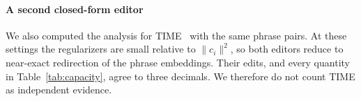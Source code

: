 \paragraph{A second closed-form editor}
We also computed the analysis for TIME~\cite{time} with the same phrase pairs. At these
settings the regularizers are small relative to $\|c_i\|^2$, so both editors reduce to
near-exact redirection of the phrase embeddings. Their edits, and every quantity in
Table~\ref{tab:capacity}, agree to three decimals. We therefore do not count TIME as
independent evidence.
